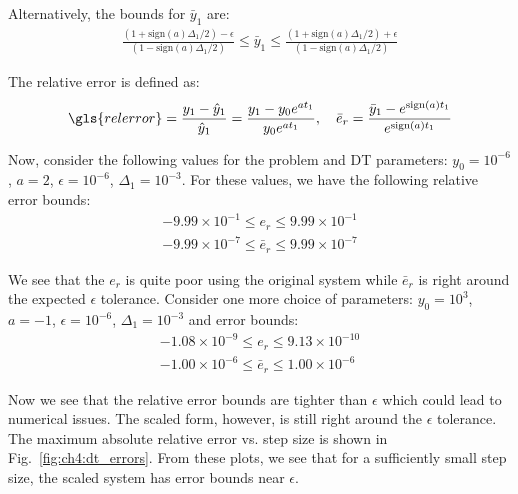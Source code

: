 \noindent Alternatively, the bounds for $\bar{y}_1$ are:
\begin{align}
\frac{\left(1+\mathrm{sign}(a)\Delta_1/2\right) - \epsilon}{\left(1-\mathrm{sign}(a)\Delta_1/2\right)} \leq \bar{y}_1 \leq \frac{\left(1+\mathrm{sign}(a)\Delta_1/2\right) + \epsilon}{\left(1-\mathrm{sign}(a)\Delta_1/2\right)}
\end{align}

\noindent The relative error is defined as:
\begin{align}
\gls{relerror} = \frac{y_1 - \hat{y}_1}{\hat{y}_1} = \frac{y_1 - y_0 e^{a t_1}}{y_0 e^{a t_1}}, \quad \bar{e}_r = \frac{\bar{y}_1 - e^{\mathrm{sign}(a) t_1}}{ e^{\mathrm{sign}(a) t_1}}
\end{align}

Now, consider the following values for the problem and DT parameters: $y_0 = 10^{-6}$, $a = 2$, $\epsilon = 10^{-6}$, $\Delta_1 = 10^{-3}$. For these values, we have the following relative error bounds:
\begin{subequations}
\begin{gather}
-9.99 \times 10^{-1} \leq e_r \leq 9.99 \times 10^{-1} \\
-9.99 \times 10^{-7} \leq \bar{e}_r \leq 9.99 \times 10^{-7}
\end{gather}
\end{subequations}

\noindent We see that the $e_r$ is quite poor using the original system while $\bar{e}_r$ is right around the expected $\epsilon$ tolerance. Consider one more choice of parameters: $y_0 = 10^{3}$, $a = -1$, $\epsilon = 10^{-6}$, $\Delta_1 = 10^{-3}$ and error bounds: 
\begin{subequations}
\begin{gather}
-1.08 \times 10^{-9} \leq e_r \leq 9.13 \times 10^{-10} \\
-1.00 \times 10^{-6} \leq \bar{e}_r \leq 1.00 \times 10^{-6}
\end{gather}
\end{subequations}



\noindent Now we see that the relative error bounds are tighter than $\epsilon$ which could lead to numerical issues. The scaled form, however, is still right around the $\epsilon$ tolerance. The maximum absolute relative error vs. step size is shown in Fig.~\ref{fig:ch4:dt_errors}. From these plots, we see that for a sufficiently small step size, the scaled system has error bounds near $\epsilon$.

